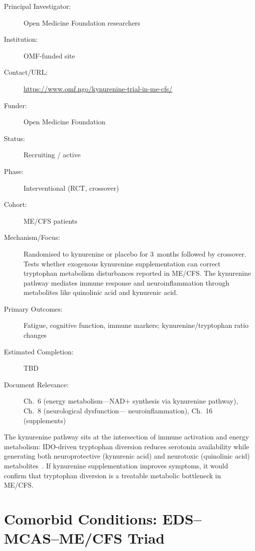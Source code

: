 \begin{description}
    \item[Principal Investigator:] Open Medicine Foundation researchers
    \item[Institution:] OMF-funded site
    \item[Contact/URL:] \url{https://www.omf.ngo/kynurenine-trial-in-me-cfs/}
    \item[Funder:] Open Medicine Foundation
    \item[Status:] Recruiting / active
    \item[Phase:] Interventional (RCT, crossover)
    \item[Cohort:] ME/CFS patients
    \item[Mechanism/Focus:] Randomised to kynurenine or placebo for 3~months
        followed by crossover.  Tests whether exogenous kynurenine
        supplementation can correct tryptophan metabolism disturbances
        reported in ME/CFS.  The kynurenine pathway mediates immune response
        and neuroinflammation through metabolites like quinolinic acid and
        kynurenic acid.
    \item[Primary Outcomes:] Fatigue, cognitive function, immune markers;
        kynurenine/tryptophan ratio changes
    \item[Estimated Completion:] TBD
    \item[Document Relevance:] Ch.~6 (energy metabolism---NAD+ synthesis
        via kynurenine pathway), Ch.~8 (neurological dysfunction---
        neuroinflammation), Ch.~16 (supplements)
\end{description}

The kynurenine pathway sits at the intersection of immune activation and
energy metabolism: IDO-driven tryptophan diversion reduces serotonin
availability while generating both neuroprotective (kynurenic acid) and
neurotoxic (quinolinic acid) metabolites~\cite{OMFkynureninetrial}.
If kynurenine supplementation improves symptoms, it would confirm that
tryptophan diversion is a treatable metabolic bottleneck in ME/CFS.

\section{Comorbid Conditions: EDS--MCAS--ME/CFS Triad}
\label{sec:registry-comorbid-triad}

